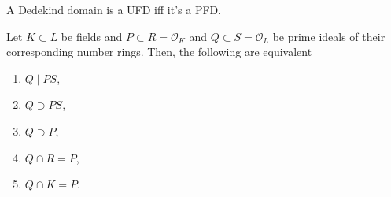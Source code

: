 \begin{theorem}
	A Dedekind domain is a UFD iff it's a PFD.
\end{theorem}

\begin{theorem}
	Let $K \subset L$ be fields and $P \subset R = \mathcal O_K$ and $Q \subset S = \mathcal O_L$ be prime ideals of their corresponding number rings. Then, the following are equivalent
	\begin{enumerate}
		\item $Q \mid PS$,
		\item $Q \supset PS$,
		\item $Q \supset P$,
		\item $Q \cap R = P$,
		\item $Q \cap K = P$.
	\end{enumerate}
\end{theorem}
